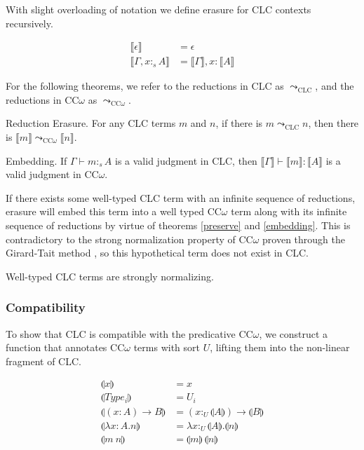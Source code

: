 \documentclass[sigplan,screen,review,anonymous]{acmart}
\newcommand{\utype}{:_{\scriptscriptstyle U}}
\newcommand{\stype}[1]{:_#1}
\newcommand{\step}{\leadsto}
\newcommand{\erase}[1]{\llbracket #1 \rrbracket}
\newcommand{\lift}[1]{\llparenthesis #1 \rrparenthesis}
\begin{document}
With slight overloading of notation we define erasure for CLC contexts recursively.

\begin{definition}
  \begin{align*}
    \erase{\epsilon}              & = \epsilon                      \\
    \erase{\Gamma, x \stype{s} A} & = \erase{\Gamma}, x : \erase{A}
  \end{align*}
\end{definition}

For the following theorems, we refer to the reductions in CLC as $\step_{\scriptscriptstyle \text{CLC}}$, and the reductions in CC$\omega$ as $\step_{\scriptscriptstyle \text{CC$\omega$}}$.

\begin{theorem} \label{preserve}
  Reduction Erasure. For any CLC terms $m$ and $n$, if there is $m \step_{\scriptscriptstyle \text{CLC}} n$, then there is $\erase{m} \step_{\scriptscriptstyle \text{CC$\omega$}} \erase{n}$.
\end{theorem}

\begin{theorem} \label{embedding}
  Embedding. If $\Gamma \vdash m \stype{s} A$ is a valid judgment in CLC, then $\erase{\Gamma} \vdash \erase{m} : \erase{A}$ is a valid judgment in CC$\omega$.
\end{theorem}

If there exists some well-typed CLC term with an infinite sequence of reductions, erasure will embed this term into a well typed CC$\omega$ term along with its infinite sequence of reductions by virtue of theorems \ref{preserve} and \ref{embedding}. This is contradictory to the strong normalization property of CC$\omega$ proven through the Girard-Tait method \cite{ecc}, so this hypothetical term does not exist in CLC.

\begin{theorem}
  Well-typed CLC terms are strongly normalizing.
\end{theorem}

\subsubsection{Compatibility}
To show that CLC is compatible with the predicative CC$\omega$, we construct a function that annotates CC$\omega$ terms with sort $U$, lifting them into the non-linear fragment of CLC.

\begin{definition}
  \begin{align*}
    \lift{x}                     & = x                                        \\
    \lift{Type_i}                & = U_i                                      \\
    \lift{(x : A) \rightarrow B} & = (x \utype \lift{A}) \rightarrow \lift{B} \\
    \lift{\lambda x : A.n}       & = \lambda x\utype\lift{A}.\lift{n}         \\
    \lift{m\ n}                  & = \lift{m}\ \lift{n}
  \end{align*}
\end{definition}
\end{document}
